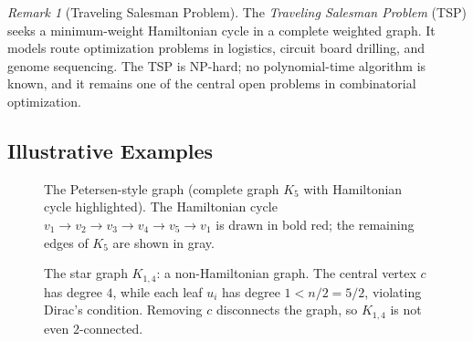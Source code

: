 \documentclass[12pt,a4paper]{article}
\theoremstyle{definition}
\theoremstyle{plain}
\theoremstyle{remark}
\newtheorem{remark}{Remark}[section]
\begin{document}
\begin{remark}[Traveling Salesman Problem]\label{rem:tsp}
The \emph{Traveling Salesman Problem} (TSP) seeks a minimum-weight Hamiltonian cycle in
a complete weighted graph. It models route optimization problems in logistics, circuit
board drilling, and genome sequencing. The TSP is NP-hard; no polynomial-time algorithm
is known, and it remains one of the central open problems in combinatorial optimization.
\end{remark}

\subsection{Illustrative Examples}

\begin{figure}[htbp]
  \centering
  \caption{The Petersen-style graph (complete graph $K_5$ with Hamiltonian cycle
           highlighted). The Hamiltonian cycle $v_1 \to v_2 \to v_3 \to v_4 \to v_5
           \to v_1$ is drawn in bold red; the remaining edges of $K_5$ are shown in
           gray.}
  \label{fig:hamiltonian-cycle}
\end{figure}

\begin{figure}[htbp]
  \centering
  \caption{The star graph $K_{1,4}$: a non-Hamiltonian graph. The central vertex $c$
           has degree $4$, while each leaf $u_i$ has degree $1 < n/2 = 5/2$, violating
           Dirac's condition. Removing $c$ disconnects the graph, so $K_{1,4}$ is not
           even $2$-connected.}
  \label{fig:non-hamiltonian}
\end{figure}
\end{document}
